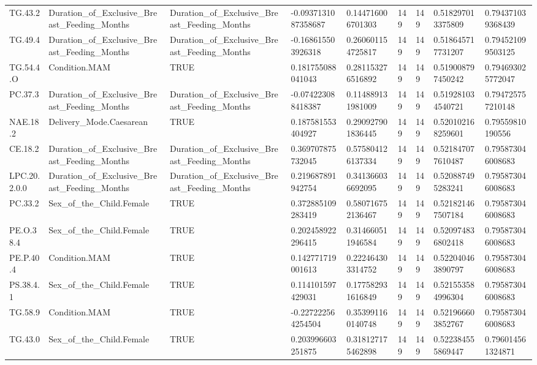\begin{longtable}{lllllllll}
TG.43.2 & Duration\_of\_Exclusive\_Breast\_Feeding\_Months & Duration\_of\_Exclusive\_Breast\_Feeding\_Months & -0.0937131087358687 & 0.144716006701303 & 149 & 149 & 0.518297013375809 & 0.794371039368439 \\
TG.49.4 & Duration\_of\_Exclusive\_Breast\_Feeding\_Months & Duration\_of\_Exclusive\_Breast\_Feeding\_Months & -0.168615503926318 & 0.260601154725817 & 149 & 149 & 0.518645717731207 & 0.794521099503125 \\
TG.54.4.O & Condition.MAM & TRUE & 0.181755088041043 & 0.281153276516892 & 149 & 149 & 0.519008797450242 & 0.794693025772047 \\
PC.37.3 & Duration\_of\_Exclusive\_Breast\_Feeding\_Months & Duration\_of\_Exclusive\_Breast\_Feeding\_Months & -0.074223088418387 & 0.114889131981009 & 149 & 149 & 0.519281034540721 & 0.794725757210148 \\
NAE.18.2 & Delivery\_Mode.Caesarean & TRUE & 0.187581553404927 & 0.290927901836445 & 149 & 149 & 0.520102168259601 & 0.79559810190556 \\
CE.18.2 & Duration\_of\_Exclusive\_Breast\_Feeding\_Months & Duration\_of\_Exclusive\_Breast\_Feeding\_Months & 0.369707875732045 & 0.575804126137334 & 149 & 149 & 0.521847077610487 & 0.795873046008683 \\
LPC.20.2.0.0 & Duration\_of\_Exclusive\_Breast\_Feeding\_Months & Duration\_of\_Exclusive\_Breast\_Feeding\_Months & 0.219687891942754 & 0.341366036692095 & 149 & 149 & 0.520887495283241 & 0.795873046008683 \\
PC.33.2 & Sex\_of\_the\_Child.Female & TRUE & 0.372885109283419 & 0.580716752136467 & 149 & 149 & 0.521821467507184 & 0.795873046008683 \\
PE.O.38.4 & Sex\_of\_the\_Child.Female & TRUE & 0.202458922296415 & 0.314660511946584 & 149 & 149 & 0.520974836802418 & 0.795873046008683 \\
PE.P.40.4 & Condition.MAM & TRUE & 0.142771719001613 & 0.222464303314752 & 149 & 149 & 0.522040463890797 & 0.795873046008683 \\
PS.38.4.1 & Sex\_of\_the\_Child.Female & TRUE & 0.114101597429031 & 0.177582931616849 & 149 & 149 & 0.521553584996304 & 0.795873046008683 \\
TG.58.9 & Condition.MAM & TRUE & -0.227222564254504 & 0.353991160140748 & 149 & 149 & 0.521966603852767 & 0.795873046008683 \\
TG.43.0 & Sex\_of\_the\_Child.Female & TRUE & 0.203996603251875 & 0.318127175462898 & 149 & 149 & 0.522384555869447 & 0.796014561324871 \\

\end{longtable}
